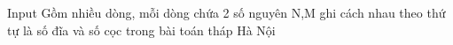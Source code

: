 Input
Gồm nhiều dòng, mỗi dòng chứa 2 số nguyên N,M ghi cách nhau theo thứ tự là số đĩa và số cọc trong bài toán tháp Hà Nội